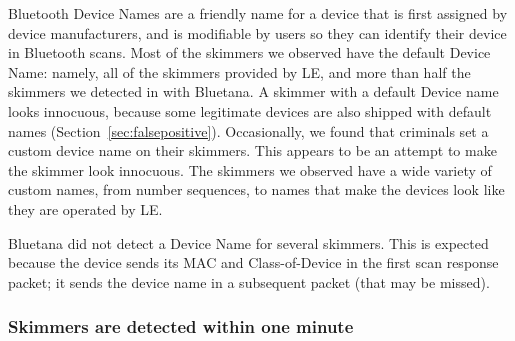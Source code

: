 Bluetooth Device Names are a friendly name for a device that is first assigned by device manufacturers,
and is modifiable by users so they can identify their device in
Bluetooth scans.
%
%
Most of the skimmers we observed have the default Device Name: namely, all of the
skimmers provided by LE, and more than half the skimmers we detected in with
Bluetana. 
%
%
A skimmer with a default Device name looks innocuous, because some legitimate devices
are also shipped with default names (Section~\ref{sec:falsepositive}).
% 
Occasionally, we found that criminals set a custom device name on their skimmers.
%
This appears to be an attempt to make the skimmer look innocuous.
%
The skimmers we observed have a wide variety of custom names, from number sequences, to names that
make the devices look like they are operated by LE.
%
 
Bluetana did not detect a Device Name for several skimmers.
%
This is expected because the device sends its MAC and Class-of-Device in the
first scan response packet; it sends the device name in a subsequent packet
(that may be missed).

%

%

\subsubsection*{Skimmers are detected within one minute}


